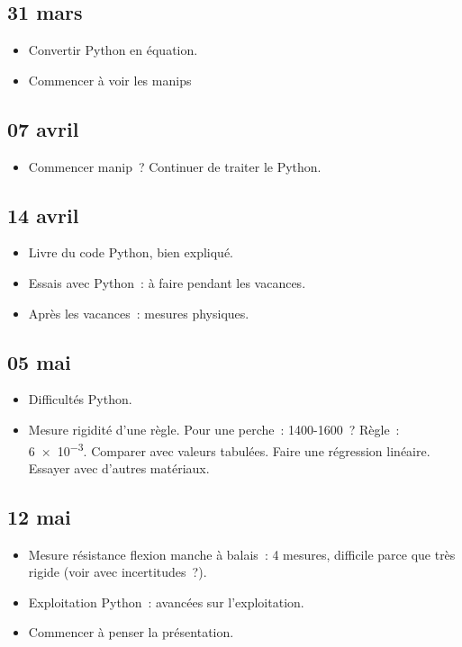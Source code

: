 \documentclass[a4paper, 11pt, final, garamond]{book}
\begin{document}
\subsection{31 mars}
\begin{itemize}
  ~: trouvé coefficient de rigidité de flexion, $EI$ avec $E$
    module d'\textsc{Young}.
  \item Convertir Python en équation.
  \item Commencer à voir les manips
\end{itemize}

\subsection{07 avril}
\begin{itemize}
  \item Commencer manip~? Continuer de traiter le Python.
\end{itemize}

\subsection{14 avril}
\begin{itemize}
  \item Livre du code Python, bien expliqué.
  \item Essais avec Python~: à faire pendant les vacances.
  \item Après les vacances~: mesures physiques.
\end{itemize}

\subsection{05 mai}
\begin{itemize}
  \item Difficultés Python.
  \item Mesure rigidité d'une règle. Pour une perche~: 1400-1600~? Règle~:
    \num{6e-3}. Comparer avec valeurs tabulées. Faire une régression linéaire.
    Essayer avec d'autres matériaux.
\end{itemize}

\subsection{12 mai}
\begin{itemize}
  \item Mesure résistance flexion manche à balais~: 4 mesures, difficile parce
    que très rigide (voir avec incertitudes~?).
  \item Exploitation Python~: avancées sur l'exploitation.
  \item Commencer à penser la présentation.
\end{itemize}
\end{document}
